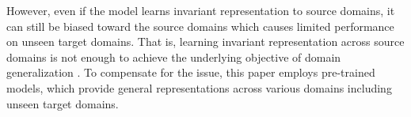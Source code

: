However, even if the model learns invariant representation to source domains, it can still be biased toward the source domains which causes limited performance on unseen target domains. That is, learning invariant representation across source domains is not enough to achieve the underlying objective of domain generalization \cite{bui2021mdsdi,chattopadhyay2020dmg,chen2022preserving}. 
To compensate for the issue, this paper employs pre-trained models, which provide general representations across various domains including unseen target domains.



